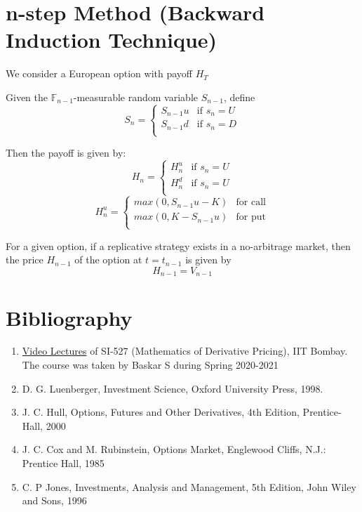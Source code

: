 \documentclass{report}
\begin{document}
\section{n-step Method (Backward Induction Technique)}
We consider a European option with payoff $H_T$


Given the $\mathbb{F}_{n-1}$-measurable random variable $S_{n-1}$, define
\[
S_n = 
\begin{cases}
    S_{n-1}u & \text{if } s_n = U \\
    S_{n-1}d & \text{if } s_n = D \\
\end{cases}
\]

Then the payoff is given by:
\[
H_n = \begin{cases}
    H_n^u & \text{if } s_n = U \\
    H_n^d & \text{if } s_n = U \\
\end{cases}\]
\[
H_n^u = \begin{cases}
    max(0, S_{n-1}u-K) & \text{for call}\\
    max(0, K-S_{n-1}u) & \text{for put} \\ 
\end{cases}\]

For a given option, if a replicative strategy exists in a no-arbitrage market, then the price $H_{n-1}$ of the option at $t = t_{n-1}$ is given by
\[H_{n-1} = V_{n-1}\]







\clearpage
\section*{Bibliography}
\begin{enumerate}
    \item \href{https://www.youtube.com/playlist?list=PLjAj1Z92T7LTcyjV-Di2_a4mij9_5fKkM}{Video Lectures} of SI-527 (Mathematics of Derivative Pricing), IIT Bombay. The course was taken by Baskar S during Spring 2020-2021
    \item D. G. Luenberger, Investment Science, Oxford University Press, 1998.
    \item J. C. Hull, Options, Futures and Other Derivatives, 4th Edition, Prentice-Hall, 2000
    \item J. C. Cox and M. Rubinstein, Options Market, Englewood Cliffs, N.J.: Prentice Hall, 1985
    \item C. P Jones, Investments, Analysis and Management, 5th Edition, John Wiley and Sons, 1996
\end{enumerate}
\end{document}
